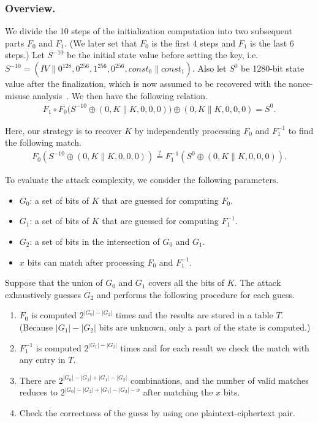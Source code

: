 \subsubsection{Overview.}
We divide the 10 steps of the initialization computation into two subsequent parts $F_0$ and $F_1$. (We later set that $F_0$ is the first 4 steps and $F_1$ is the last 6 steps.) Let $S^{-10}$ be the initial state value before setting the key, i.e.~$S^{-10} = (IV\|0^{128},0^{256},1^{256},0^{256},const_0\|const_1)$. Also let $S^0$ be 1280-bit state value after the finalization, which is now assumed to be recovered with the nonce-misuse analysis~\cite{cryptoeprint:2017:1137}. We then have the following relation.
\begin{align*}
F_1 \circ F_0 \bigl(S^{-10} \oplus (0, K\|K, 0, 0, 0)\bigr) \oplus (0,K\|K,0,0,0) = S^0.
\end{align*}

Here, our strategy is to recover $K$ by independently processing $F_0$ and $F_1^{-1}$ to find the following match.
\begin{align*}
F_0 (S^{-10} \oplus (0, K\|K, 0, 0, 0)) \stackrel{?}{=} F_1^{-1} (S^0 \oplus (0,K\|K,0,0,0)).
\end{align*}

To evaluate the attack complexity, we consider the following parameters.
\begin{itemize}
\item $G_0$: a set of bits of $K$ that are guessed for computing $F_0$.
\item $G_1$: a set of bits of $K$ that are guessed for computing $F_1^{-1}$.
\item $G_2$: a set of bits in the intersection of $G_0$ and $G_1$.
\item $x$ bits can match after processing $F_0$ and $F_1^{-1}$.
\end{itemize}
Suppose that the union of $G_0$ and $G_1$ covers all the bits of $K$. The attack exhaustively guesses $G_2$ and performs the following procedure for each guess.
\begin{enumerate}
\item $F_0$ is computed $2^{|G_0|-|G_2|}$ times and the results are stored in a table $T$. (Because $|G_1|-|G_2|$ bits are unknown, only a part of the state is computed.)
\item $F_1^{-1}$ is computed $2^{|G_1|-|G_2|}$ times and for each result we check the match with any entry in $T$.
\item There are $2^{|G_0|-|G_2| + |G_1|-|G_2|}$ combinations, and the number of valid matches reduces to $2^{|G_0|-|G_2| + |G_1|-|G_2| - x}$ after matching the $x$ bits.
\item Check the correctness of the guess by using one plaintext-ciphertext pair.
\end{enumerate}

